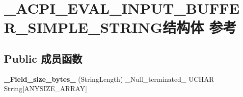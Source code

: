 \hypertarget{struct___a_c_p_i___e_v_a_l___i_n_p_u_t___b_u_f_f_e_r___s_i_m_p_l_e___s_t_r_i_n_g}{}\section{\+\_\+\+A\+C\+P\+I\+\_\+\+E\+V\+A\+L\+\_\+\+I\+N\+P\+U\+T\+\_\+\+B\+U\+F\+F\+E\+R\+\_\+\+S\+I\+M\+P\+L\+E\+\_\+\+S\+T\+R\+I\+N\+G结构体 参考}
\label{struct___a_c_p_i___e_v_a_l___i_n_p_u_t___b_u_f_f_e_r___s_i_m_p_l_e___s_t_r_i_n_g}
\subsection*{Public 成员函数}
\begin{DoxyCompactItemize}
\item 
\mbox{\label{struct___a_c_p_i___e_v_a_l___i_n_p_u_t___b_u_f_f_e_r___s_i_m_p_l_e___s_t_r_i_n_g_a20cd4edc6a47376d99c0d333e717124f}} 
{\bfseries \+\_\+\+Field\+\_\+size\+\_\+bytes\+\_\+} (String\+Length) \+\_\+\+Null\+\_\+terminated\+\_\+ U\+C\+H\+AR String\mbox{[}A\+N\+Y\+S\+I\+Z\+E\+\_\+\+A\+R\+R\+AY\mbox{]}
\end{DoxyCompactItemize}
